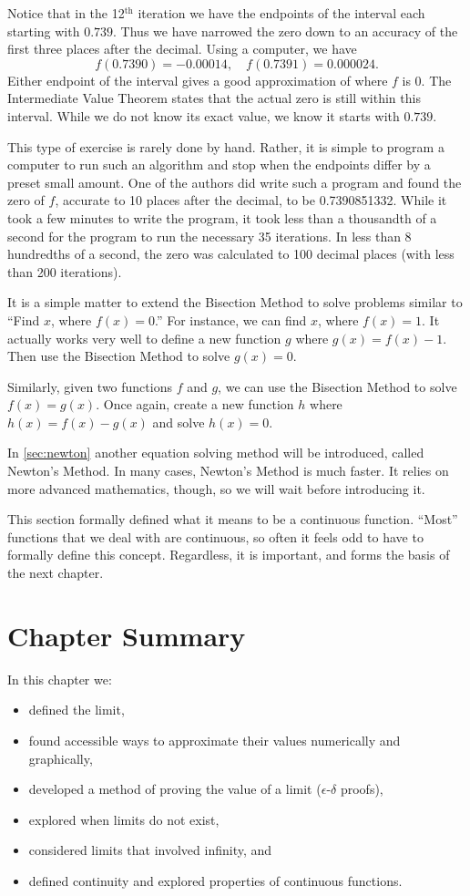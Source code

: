 {Notice that in the 12$^\text{th}$ iteration we have the endpoints of the interval each starting with $0.739$. Thus we have narrowed the zero down to an accuracy of the first three places after the decimal. Using a computer, we have 
$$ f(0.7390) = -0.00014, \quad f(0.7391) = 0.000024.$$ Either endpoint of the interval gives a good approximation of where $f$ is 0. The Intermediate Value Theorem states that the actual zero is still within this interval. While we do not know its exact value, we know it starts with $0.739$. 

This type of exercise is rarely done by hand. Rather, it is simple to program a computer to run such an algorithm and stop when the endpoints differ by a preset small amount. One of the authors did write such a program and found the zero of $f$, accurate to 10 places after the decimal, to be 0.7390851332. While it took a few minutes to write the program, it took less than a thousandth of a second for the program to run the necessary 35 iterations. In less than 8 hundredths of a second, the zero was calculated to 100 decimal places (with less than 200 iterations).}

It is a simple matter to extend the Bisection Method to solve problems similar to ``Find $x$, where $f(x) = 0$.'' For instance, we can find $x$, where $f(x) = 1$. %
It actually works very well to define a new function $g$ where $g(x) = f(x) - 1$. Then use the Bisection Method to solve $g(x)=0$.  

Similarly, given two functions $f$ and $g$, we can use the Bisection Method to solve $f(x) = g(x)$. Once again, create a new function $h$ where $h(x) = f(x)-g(x)$ and solve $h(x) = 0$. 

In \autoref{sec:newton} another equation solving method will be introduced, called Newton's Method. In many cases, Newton's Method is much faster. It relies on more advanced mathematics, though, so we will wait before introducing it. 

This section formally defined what it means to be a continuous function. ``Most'' functions that we deal with are continuous, so often it feels odd to have to formally define this concept. Regardless, it is important, and forms the basis of the next chapter.

\section*{Chapter Summary}

In this chapter we:
\begin{itemize}
\item defined the limit, 
\item found accessible ways to approximate their values numerically and graphically, 
\item	developed a method of proving the value of a limit ($\epsilon$-$\delta$ proofs),
\item	explored when limits do not exist,
\item	considered limits that involved infinity, and
\item	defined continuity and explored properties of continuous functions.
\end{itemize}

